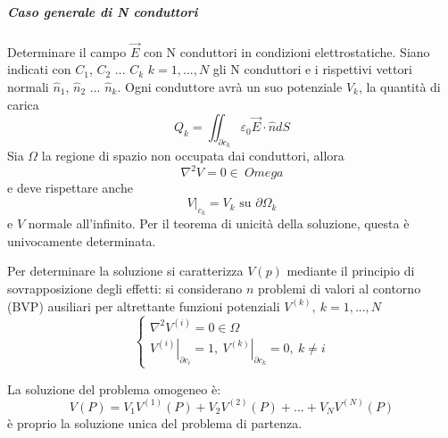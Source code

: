 \subparagraph{Caso generale di N conduttori}
Determinare il campo $\vec{E}$ con N conduttori in condizioni elettrostatiche.
Siano indicati con $C_1$, $C_2$ ... $C_k$ $k=1,...,N$ gli N conduttori e i rispettivi vettori normali
$\hat{n}_1$, $\hat{n}_2$ ... $\hat{n}_k$.
Ogni conduttore avrà un suo potenziale $V_k$, la quantità di carica 
$$
Q_k = \iint_{\partial c_k} \varepsilon_0 \vec{E}\cdot\hat{n} dS
$$
Sia $\Omega$ la regione di spazio non occupata dai conduttori, allora
$$
\nabla^2 V = 0 \in \ Omega 
$$
e deve rispettare anche
$$
\left. V \right|_{c_k} = V_k \text{ su } \partial \Omega_k
$$
e $V$ normale all'infinito.
Per il teorema di unicità della soluzione, questa è univocamente determinata.

Per determinare la soluzione si caratterizza $V(p)$ mediante il principio di sovrapposizione degli effetti:
si considerano $n$ problemi di valori al contorno (BVP) ausiliari per altrettante funzioni
potenziali $V^{(k)},\ k=1,...,N$
$$
\begin{cases}
\nabla^2 V^{(i)} = 0 \in \Omega \\
\left.V^{(i)}\right|_{\partial c_i} =  1,\ \left.V^{(k)}\right|_{\partial c_k} = 0,\ k \neq i
\end{cases}
$$

La soluzione del problema omogeneo è:
$$
V(P) = V_1 V^{(1)}(P) + V_2 V^{(2)}(P) + ... + V_NV^{(N)}(P)
$$
è proprio la soluzione unica del problema di partenza.
